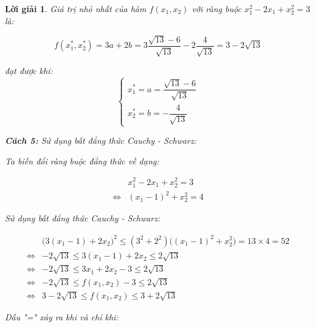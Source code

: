 \documentclass[14pt, a4paper]{article}
\theoremstyle{sltheorem}
\theoremstyle{soltheorem}
\newtheorem*{loigiai}{Lời giải}
\begin{document}
\begin{loigiai}
        Giá trị nhỏ nhất của hàm $f(x_1, x_2)$ với ràng buộc $x_1^2 - 2x_1 + x_2^2 = 3$ là:

        \begin{equation*}
            f(x_1^*, x_2^*) = 3 a + 2b = 3 \dfrac{\sqrt{13} - 6}{\sqrt{13}} - 2 \dfrac{4}{\sqrt{13}}  = 3 - 2\sqrt{13}
        \end{equation*}

        đạt được khi:
        \begin{equation*}
            \begin{cases} 
                x_1^* = a = \dfrac{\sqrt{13} - 6}{\sqrt{13}} \\ 
                x_2^* = b = - \dfrac{4}{\sqrt{13}} 
            \end{cases}
        \end{equation*}

        \textbf{Cách 5:} Sử dụng bất đẳng thức Cauchy - Schwarz:

        Ta biến đổi ràng buộc đẳng thức về dạng:

        \begin{equation*}
            \begin{aligned}
            &x_1^2 - 2x_1 + x_2^2 = 3 \\
            \Leftrightarrow & (x_1 - 1)^2 + x_2^2 = 4
            \end{aligned}
        \end{equation*}

        Sử dụng bất đẳng thức Cauchy - Schwarz:

        \begin{equation*}
            \begin{aligned}
            &\Big ( 3(x_1 - 1) + 2x_2 \Big )^2 \leq (3^2 + 2^2)\Big ( (x_1 - 1)^2 + x_2^2 \Big) = 13\times4 = 52 \\
            \Leftrightarrow & - 2\sqrt{13} \leq 3(x_1 - 1) + 2x_2 \leq 2 \sqrt{13} \\
            \Leftrightarrow & - 2 \sqrt{13} \leq 3 x_1 + 2 x_2 - 3 \leq 2 \sqrt{13} \\
            \Leftrightarrow & - 2 \sqrt{13} \leq f(x_1, x_2) - 3 \leq 2 \sqrt{13} \\
            \Leftrightarrow & 3 - 2 \sqrt{13} \leq f(x_1, x_2) \leq 3 + 2 \sqrt{13}
            \end{aligned}
        \end{equation*}

        Dấu "=" xảy ra khi và chỉ khi:


\end{loigiai}
\end{document}
